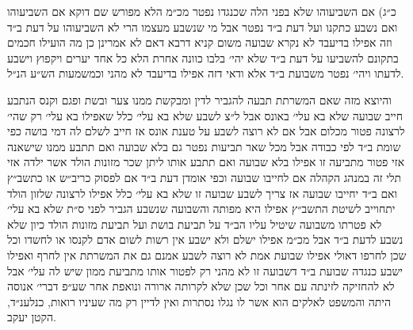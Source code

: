\documentclass[12pt, openany]{book}
\begin{document}
\begin{multicols}{2}
כ״ג) אם השביעוהו שלא בפני הלה שכנגדו נפטר מכ״מ הלא מפורש שם דוקא אם השביעוהו ואם נשבע כתקנו ועל דעת ב״ד נפטר אבל מי שנשבע מעצמו הרי לא השביעוהו על דעת ב״ד וזה אפילו בדיעבד לא נקרא שבועה משום קניא דרבא דאם לא אמרינן כן מה הועילו חכמים בתקונם להשביעו על דעת ב״ד שלא יהי׳ בלבו כוונה אחרת הלא כל אחד יערים ויקפוץ וישבע לדעתו ויהי׳ נפטר משבועת ב״ד אלא ודאי דזה אפילו בדיעבד לא מהני וכמשמעות הש״ע הנ״ל.\\\vspace{0pt}

והיוצא מזה שאם המשרתת תבעה להגביר לדין ומבקשת ממנו צער ובשת ופגם וקנס הנתבע חייב שבועה שלא בא עלי׳ באונס אבל ל״צ לשבע שלא בא עלי׳ כלל שאפילו בא עלי׳ רק שהי׳ לרצונה פטור מכלום אבל אם לא רוצה לשבע על טענת אונס אז חייב לשלם לה דמי בושה כפי שומת ב״ד לפי כבודה אבל מכל שאר תביעות נפטר גם בלא שבועה ואם תתבע ממנו שישאנה אזי פטור מתביעה זו אפילו בלא שבועה ואם תתבע אותו ליתן שכר מזונות הולד אשר ילדה אזי תלי זה במנהג הקהלה אם לחייבו שבועה וכפי אומדן דעת ב״ד אם לפסוק כריב״ש או כתשב״ץ ואם ב״ד יחייבו שבועה אז צריך לשבע שבועה זו שלא בא עלי׳ כלל אפילו לרצונה שלזון הולד יתחוייב לשיטת התשב״ץ אפילו היא מפותה והשבועה שנשבע הגביר לפני ס״ת שלא בא עלי׳ לא פטרתו משבועה שיטיל עליו הב״ד על תביעת בושת ועל תביעת מזונות הולד כיון שלא נשבע לדעת ב״ד אבל מכ״מ אפילו ישלם ולא ישבע אין רשות לשום אדם לקנסו או לחשדו וכל שכן לחרפו דאולי אפילו שבועת אמת לא רוצה לשבע אמנם גם את המשרתת אין לחרף ואפילו ישבע כנגדה שבועת ב״ד דשבועה זו לא מהני רק לפטור אותו מתביעת ממון שיש לה עלי׳ אבל לא להחזיקה לזינתה עם אחר וכל שכן שלא לקרותה ארורה ונואפת אחר שע״פ דברי׳ אנוסה היתה והמשפט לאלקים הוא אשר לו נגלו נסתרות ואין לדיין רק מה שעיניו רואות, כנלענ״ד, הקטן יעקב.\\\vspace{0pt}

\end{multicols}\newpage
\end{document}
